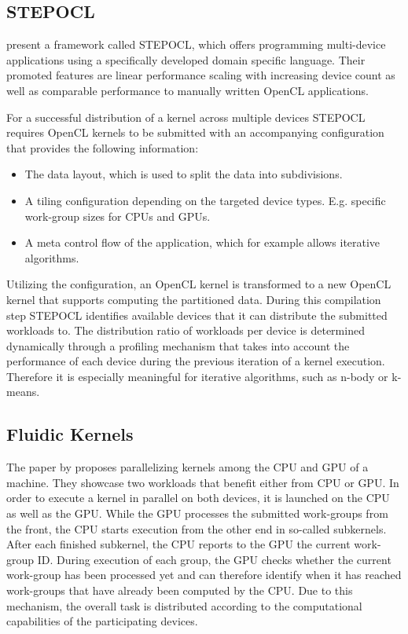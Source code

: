 \subsection*{STEPOCL}

\citeauthor{stepocl} present a framework called STEPOCL, which offers programming multi-device applications using a specifically developed domain specific language\cite{stepocl}. Their promoted features are linear performance scaling with increasing device count as well as comparable performance to manually written OpenCL applications.

For a successful distribution of a kernel across multiple devices STEPOCL requires OpenCL kernels to be submitted with an accompanying configuration that provides the following information:
\begin{itemize}
    \item The data layout, which is used to split the data into subdivisions.
    \item A tiling configuration depending on the targeted device types. E.g. specific work-group sizes for CPUs and GPUs.
    \item A meta control flow of the application, which for example allows iterative algorithms.
\end{itemize}

Utilizing the configuration, an OpenCL kernel is transformed to a new OpenCL kernel that supports computing the partitioned data. During this compilation step STEPOCL identifies available devices that it can distribute the submitted workloads to. The distribution ratio of workloads per device is determined dynamically through a profiling mechanism that takes into account the performance of each device during the previous iteration of a kernel execution. Therefore it is especially meaningful for iterative algorithms, such as n-body or k-means.

\subsection*{Fluidic Kernels}

The paper by \citeauthor{fluidic} proposes parallelizing kernels among the CPU and GPU of a machine\cite{fluidic}. They showcase two workloads that benefit either from CPU or GPU. In order to execute a kernel in parallel on both devices, it is launched on the CPU as well as the GPU. While the GPU processes the submitted work-groups from the front, the CPU starts execution from the other end in so-called subkernels. After each finished subkernel, the CPU reports to the GPU the current work-group ID. During execution of each group, the GPU checks whether the current work-group has been processed yet and can therefore identify when it has reached work-groups that have already been computed by the CPU. Due to this mechanism, the overall task is distributed according to the computational capabilities of the participating devices.



